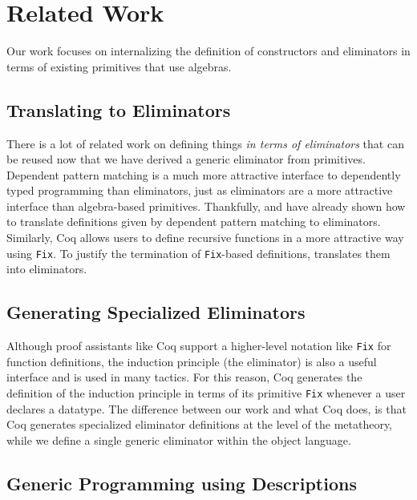 \documentclass[preprint,nonatbib]{sigplanconf}
\begin{document}
\section{Related Work}
\label{sec:related-work}

Our work focuses on internalizing the definition of constructors and
eliminators in terms of existing primitives that use algebras. 

\subsection{Translating to Eliminators}

There is a lot of related work on defining things
{\it in terms of eliminators} that can be reused now that we have
derived a generic eliminator from primitives.
Dependent pattern matching is a much more attractive interface to
dependently typed programming than eliminators, just as eliminators
are a more attractive interface than algebra-based primitives.
Thankfully, \citet{Goguen06eliminatingdependent} and
\citet{McBride:2000:EM:646540.759262} have already shown how to
translate definitions given by dependent pattern matching to
eliminators.
Similarly, {\sc Coq} allows users to define recursive functions in a
more attractive way using {\tt Fix}. To justify the termination of
{\tt Fix}-based definitions, \citet{gimenez1995codifying} translates
them into eliminators. 

\subsection{Generating Specialized Eliminators}

Although proof assistants like {\sc Coq} support a higher-level
notation like {\tt Fix} for function definitions, the induction
principle (the eliminator) is also a useful interface and is used in 
many tactics. For this reason, {\sc Coq} generates the definition
of the induction principle in terms of its primitive {\tt Fix}
whenever a user declares a datatype. The difference between our work
and what {\sc Coq} does,  is that {\sc Coq} generates
specialized eliminator definitions at the level of the metatheory,
while we define a single generic eliminator within the object
language.

\subsection{Generic Programming using Descriptions}
\end{document}
